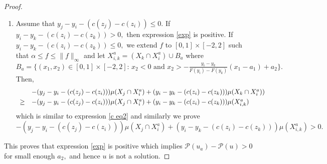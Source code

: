 \documentclass[12pt,reqno]{amsart}
\begin{document}
\begin{proof}
\begin{enumerate}
\item Assume that $y_j-y_i-(c(z_j)-c(z_i))\le0.$ If $y_i-y_k-(c(z_i)-c(z_k))>0,$ then expression \eqref{exp}  is positive. If $y_i-y_k-(c(z_i)-c(z_k))\le0,$ we extend $f$ to $[0,1]\times[-2,2]$ such that $\alpha\le f\le \|f\|_\infty$ and let $X_{i,k}^a=(X_k\cap X_i^a)\cup B_a$ where $B_a=\{(x_1,x_2)\in [0,1]\times[-2,2]:\, x_2<0 \text{ and } x_2>-\frac{y_i-y_k}{F(y_i)-F(y_k)}(x_1-a_1)+a_2\}.$
Then,
\[\begin{array}{ll}
&-(y_j-y_i-(c(z_j)-c(z_i)))\mu( X_j\cap X_i^a)+(y_i-y_k-(c(z_i)-c(z_k)))\mu( X_k\cap X_i^a))\vspace{3pt}\\
\ge&-(y_j-y_i-(c(z_j)-c(z_i)))\mu(X_j\cap X_i^a)+(y_i-y_k-(c(z_i)-c(z_k)))\mu( X_{i,k}^a)
\end{array}\] which is similar to expression \eqref{c eq2} and similarly we prove 
\[-(y_j-y_i-(c(z_j)-c(z_i)))\mu(X_j\cap X_i^a)+(y_i-y_k-(c(z_i)-c(z_k)))\mu( X_{i,k}^a)>0.\]
\end{enumerate}
This proves that expression \eqref{exp} is positive which implies $\mathcal{P}(u_a)-\mathcal{P}(u)>0$ for small enough $a_2,$ and hence $u$ is not a solution.
\end{proof}
\end{document}
